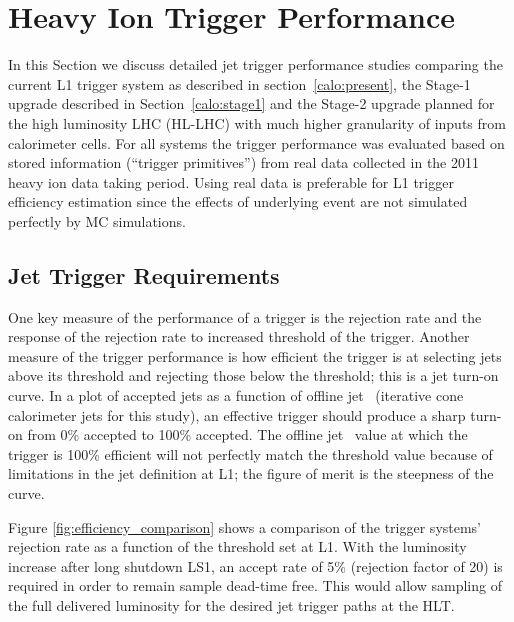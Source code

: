 \section{Heavy Ion Trigger Performance} \label{sec:hiTrigPerf}

In this Section we discuss detailed jet trigger performance studies comparing the 
current L1 trigger system as described in section~\ref{calo:present},
the Stage-1 upgrade described in Section~\ref{calo:stage1} and 
the Stage-2 upgrade  planned for the
high luminosity LHC (HL-LHC) with much higher granularity of inputs from
calorimeter cells. 
For all systems the trigger performance was evaluated based on stored 
information (``trigger primitives'') from real data 
collected in the 2011 heavy ion data taking period.
Using real data is preferable for  L1 trigger efficiency estimation since 
the effects of underlying event are not simulated perfectly by MC
simulations. 

\subsection{Jet Trigger Requirements}
One key measure of the performance of a trigger is the rejection rate and the
response of the rejection rate to increased threshold of the trigger. 
Another measure of the trigger performance  is how efficient the
trigger is at selecting jets above its threshold and rejecting those below
the threshold; this is a jet turn-on curve. In a plot of accepted jets as a
function of offline jet \pt\ (iterative cone calorimeter jets for this
study), an effective trigger should produce a sharp turn-on from 0\% accepted to
100\% accepted. The offline jet \pt\ value at which the trigger is 100\%
efficient will not perfectly match the threshold value because of limitations in the
jet definition at L1; the figure of merit is the steepness of the curve.


Figure \ref{fig:efficiency_comparison} shows a comparison of the trigger
systems' rejection rate as a function of the threshold set at L1. 
With the luminosity increase after long shutdown LS1, an accept rate of 5\% (rejection
factor of 20) is required in order to remain sample dead-time free. This would allow 
sampling of the full delivered luminosity for the desired jet trigger paths 
at the HLT. 


